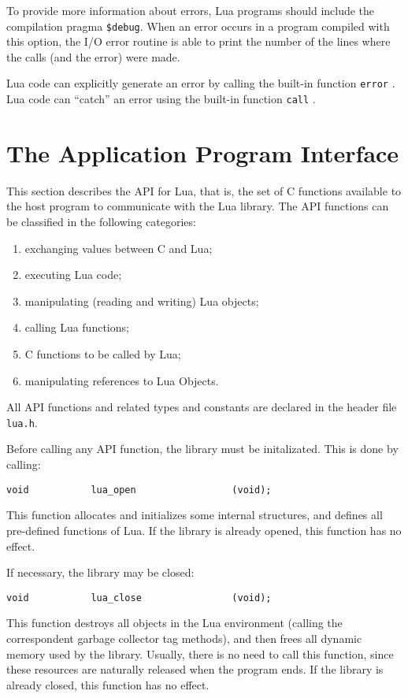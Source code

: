 To provide more information about errors,
Lua programs should include the compilation pragma \verb|$debug|.
\label{pragma}
When an error occurs in a program compiled with this option,
the I/O error routine is able to print the number of the
lines where the calls (and the error) were made.

Lua code can explicitly generate an error by calling the built-in
function \verb|error| .
Lua code can ``catch'' an error using the built-in function
\verb|call| .



\section{The Application Program Interface}

This section describes the API for Lua, that is,
the set of C functions available to the host program to communicate
with the Lua library.
The API functions can be classified in the following categories:
\begin{enumerate}
\item exchanging values between C and Lua;
\item executing Lua code;
\item manipulating (reading and writing) Lua objects;
\item calling Lua functions;
\item C functions to be called by Lua;
\item manipulating references to Lua Objects.
\end{enumerate}
All API functions and related types and constants
are declared in the header file \verb|lua.h|.

Before calling any API function,
the library must be initalizated.
This is done by calling:
\begin{verbatim}
void           lua_open                 (void);
\end{verbatim}
This function allocates and initializes some internal structures,
and defines all pre-defined functions of Lua.
If the library is already opened,
this function has no effect.

If necessary, the library may be closed:
\begin{verbatim}
void           lua_close                (void);
\end{verbatim}
This function destroys all objects in the Lua environment
(calling the correspondent garbage collector tag methods),
and then frees all dynamic memory used by the library.
Usually, there is no need to call this function,
since these resources are naturally released when the program ends.
If the library is already closed,
this function has no effect.

